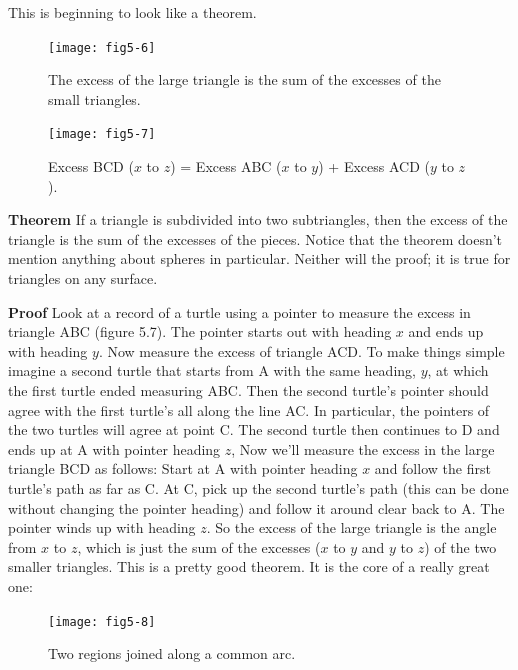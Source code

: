 \documentclass{book}
\begin{document}
This is beginning to look like a theorem.

\begin{figure}
\begin{center}
\texttt{[image: fig5-6]}
\caption{The excess of the large triangle is the sum of the excesses of the small triangles. }
\end{center}
\end{figure}

\begin{figure}
\begin{center}
\texttt{[image: fig5-7]}
\caption{Excess BCD ($x$ to $z$) = Excess ABC ($x$ to $y$) + Excess ACD ($y$ to $z$).}
\end{center}
\end{figure}

\noindent \textbf{Theorem} If a triangle is subdivided into two subtriangles, then the excess
of the triangle is the sum of the excesses of the pieces.
Notice that the theorem doesn't mention anything about spheres in
particular. Neither will the proof; it is true for triangles on any surface.

\noindent \textbf{Proof} Look at a record of a turtle using a pointer to measure the excess
in triangle ABC (figure 5.7). The pointer starts out with heading $x$ and
ends up with heading $y$. Now measure the excess of triangle ACD. To
make things simple imagine a second turtle that starts from A with the
same heading, $y$, at which the first turtle ended measuring ABC. Then
the second turtle's pointer should agree with the first turtle's all along
the line AC. In particular, the pointers of the two turtles will agree at
point C. The second turtle then continues to D and ends up at A with
pointer heading $z$, Now we'll measure the excess in the large triangle
BCD as follows: Start at A with pointer heading $x$ and follow the first
turtle's path as far as C. At C, pick up the second turtle's path (this
can be done without changing the pointer heading) and follow it around
clear back to A. The pointer winds up with heading $z$. So the excess of
the large triangle is the angle from $x$ to $z$, which is just the sum of the
excesses ($x$ to $y$ and $y$ to $z$) of the two smaller triangles.
This is a pretty good theorem. It is the core of a really great one:

\begin{figure}
\begin{center}
\texttt{[image: fig5-8]}
\caption{Two regions joined along a common arc.}
\end{center}
\end{figure}
\end{document}
